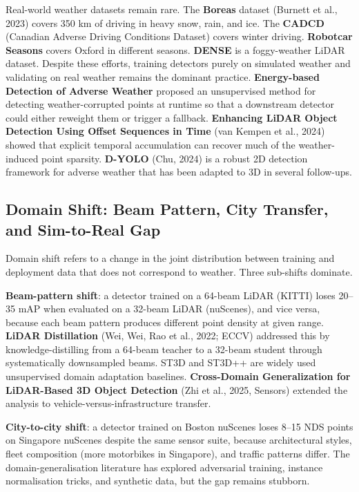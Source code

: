 \documentclass{article}
\begin{document}
Real-world weather datasets remain rare. The \textbf{Boreas} dataset (Burnett et al., 2023) covers 350 km of driving in heavy snow, rain, and ice. The \textbf{CADCD} (Canadian Adverse Driving Conditions Dataset) covers winter driving. \textbf{Robotcar Seasons} covers Oxford in different seasons. \textbf{DENSE} is a foggy-weather LiDAR dataset. Despite these efforts, training detectors purely on simulated weather and validating on real weather remains the dominant practice. \textbf{Energy-based Detection of Adverse Weather} \citep{piroli2023energybaseddetecti} proposed an unsupervised method for detecting weather-corrupted points at runtime so that a downstream detector could either reweight them or trigger a fallback. \textbf{Enhancing LiDAR Object Detection Using Offset Sequences in Time} (van Kempen et al., 2024) showed that explicit temporal accumulation can recover much of the weather-induced point sparsity. \textbf{D-YOLO} (Chu, 2024) is a robust 2D detection framework for adverse weather that has been adapted to 3D in several follow-ups.

\subsection{Domain Shift: Beam Pattern, City Transfer, and Sim-to-Real Gap}\label{domain-shift-beam-pattern-city-transfer-and-sim-to-real-gap}

Domain shift refers to a change in the joint distribution between training and deployment data that does not correspond to weather. Three sub-shifts dominate.

\textbf{Beam-pattern shift}: a detector trained on a 64-beam LiDAR (KITTI) loses 20--35 mAP when evaluated on a 32-beam LiDAR (nuScenes), and vice versa, because each beam pattern produces different point density at given range. \textbf{LiDAR Distillation} (Wei, Wei, Rao et al., 2022; ECCV) addressed this by knowledge-distilling from a 64-beam teacher to a 32-beam student through systematically downsampled beams. ST3D and ST3D++ are widely used unsupervised domain adaptation baselines. \textbf{Cross-Domain Generalization for LiDAR-Based 3D Object Detection} (Zhi et al., 2025, Sensors) extended the analysis to vehicle-versus-infrastructure transfer.

\textbf{City-to-city shift}: a detector trained on Boston nuScenes loses 8--15 NDS points on Singapore nuScenes despite the same sensor suite, because architectural styles, fleet composition (more motorbikes in Singapore), and traffic patterns differ. The domain-generalisation literature has explored adversarial training, instance normalisation tricks, and synthetic data, but the gap remains stubborn.
\end{document}
